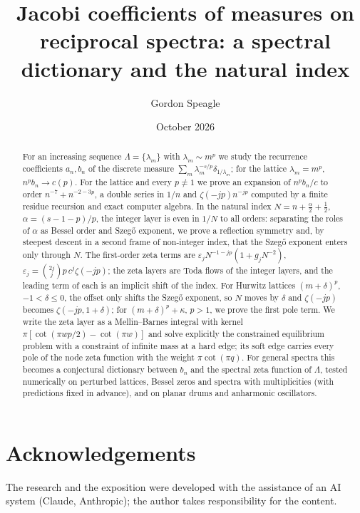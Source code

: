\documentclass[11pt]{amsart}
\title[Jacobi coefficients of measures on reciprocal spectra]{Jacobi coefficients of measures on reciprocal spectra: a
spectral dictionary and the natural index}
\author{Gordon Speagle}
\date{October 2026}
\theoremstyle{definition}
\theoremstyle{remark}
\numberwithin{equation}{section}
\numberwithin{table}{section}
\begin{document}
\begin{abstract}
For an increasing sequence $\Lambda=\{\lambda_m\}$ with $\lambda_m\sim m^p$ we study the recurrence coefficients
$a_n,b_n$ of the discrete measure $\sum_m\lambda_m^{-s/p}\delta_{1/\lambda_m}$; for the lattice $\lambda_m=m^p$,
$n^pb_n\to c(p)$. For the lattice and every $p\ne1$ we prove an expansion of $n^pb_n/c$ to order $n^{-7}+n^{-2-3p}$, a
double series in $1/n$ and $\zeta(-jp)n^{-jp}$ computed by a finite residue recursion and exact computer algebra. In the
natural index $N=n+\frac\alpha2+\frac12$, $\alpha=(s-1-p)/p$, the integer layer is even in $1/N$ to all orders: separating
the roles of $\alpha$ as Bessel order and Szeg\H{o} exponent, we prove a reflection symmetry and, by steepest descent in a
second frame of non-integer index, that the Szeg\H{o} exponent enters only through $N$. The first-order zeta terms are
$\varepsilon_jN^{-1-jp}(1+g_jN^{-2})$, $\varepsilon_j=\binom{2j}{j}p\,c^j\zeta(-jp)$; the zeta layers are Toda flows of the
integer layers, and the leading term of each is an implicit shift of the index. For Hurwitz lattices $(m+\delta)^p$, $-1<\delta\le0$, the
offset only shifts the Szeg\H{o} exponent, so $N$ moves by $\delta$ and $\zeta(-jp)$ becomes $\zeta(-jp,1+\delta)$; for
$(m+\delta)^p+\kappa$, $p>1$, we prove the first pole term. We write the zeta layer as a Mellin--Barnes integral with kernel
$\pi[\cot(\pi wp/2)-\cot(\pi w)]$ and solve explicitly the constrained equilibrium problem with a constraint of infinite
mass at a hard edge; its soft edge carries every pole of the node zeta function with the weight $\pi\cot(\pi q)$. For general
spectra this becomes a conjectural dictionary between $b_n$ and the spectral zeta function of $\Lambda$, tested
numerically on perturbed lattices, Bessel zeros and spectra with multiplicities (with predictions fixed in advance), and on
planar drums and anharmonic oscillators.
\end{abstract}

\maketitle











\appendix


\section*{Acknowledgements}
The research and the exposition were developed with the assistance of an AI system (Claude, Anthropic); the author
takes responsibility for the content.
\end{document}

